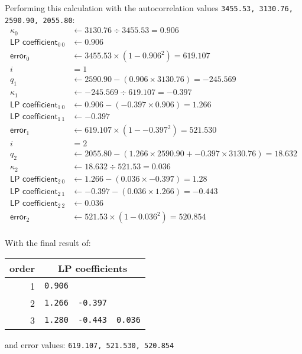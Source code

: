 Performing this calculation with the autocorrelation values
\texttt{3455.53, 3130.76, 2590.90, 2055.80}:
{
\begin{align*}
\kappa_0 &\leftarrow 3130.76 \div 3455.53 = 0.906 \\
\textsf{LP coefficient}_{0~0} &\leftarrow 0.906 \\
\textsf{error}_0 &\leftarrow 3455.53 \times (1 - {0.906} ^ 2) = 619.107 \\
i &= 1 \\
q_1 &\leftarrow 2590.90 - (0.906 \times 3130.76) = -245.569 \\
\kappa_1 &\leftarrow -245.569 \div 619.107 = -0.397 \\
\textsf{LP coefficient}_{1~0} &\leftarrow 0.906 - (-0.397 \times 0.906) = 1.266 \\
\textsf{LP coefficient}_{1~1} &\leftarrow -0.397 \\
\textsf{error}_1 &\leftarrow 619.107 \times (1 - {-0.397} ^ 2) = 521.530 \\
i &= 2 \\
q_2 &\leftarrow 2055.80 - (1.266 \times 2590.90 + -0.397 \times 3130.76) = 18.632 \\
\kappa_2 &\leftarrow 18.632 \div 521.53 = 0.036 \\
\textsf{LP coefficient}_{2~0} &\leftarrow 1.266 - (0.036 \times -0.397) = 1.28 \\
\textsf{LP coefficient}_{2~1} &\leftarrow -0.397 - (0.036 \times 1.266) = -0.443 \\
\textsf{LP coefficient}_{2~2} &\leftarrow 0.036 \\
\textsf{error}_2 &\leftarrow 521.53 \times (1 - {0.036} ^ 2) = 520.854 \\
\end{align*}
}
\par
\noindent
With the final result of:
\begin{table}[h]
\begin{tabular}{r|rrr}
order & \multicolumn{3}{c}{\textsf{LP coefficients}} \\
\hline
1 & \texttt{0.906} \\
2 & \texttt{1.266} & \texttt{-0.397} \\
3 & \texttt{1.280} & \texttt{-0.443} & \texttt{0.036} \\
\end{tabular}
\end{table}
\par
\noindent
and \textsf{error} values: \texttt{619.107, 521.530, 520.854}

